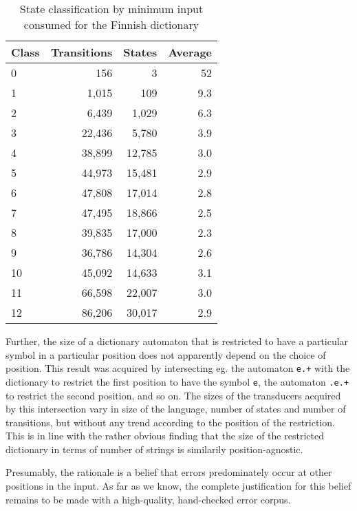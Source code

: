 \documentclass[free]{flammie}
\begin{document}
\begin{table}[h]
\begin{center}
\begin{scriptsize}
\begin{tabular}{|l|rrr|}
\hline
\bf Class & \bf Transitions & \bf States & \bf Average \\ 
\hline
0 & 156 & 3 & 52 \\
1 & 1,015 & 109 & 9.3 \\
2 & 6,439 & 1,029 & 6.3 \\
3 & 22,436 & 5,780 & 3.9 \\
4 & 38,899 & 12,785 & 3.0 \\
5 & 44,973 & 15,481 & 2.9 \\
6 & 47,808 & 17,014 & 2.8 \\
7 & 47,495 & 18,866 & 2.5 \\
8 & 39,835 & 17,000 & 2.3 \\
9 & 36,786 & 14,304 & 2.6 \\
10 & 45,092 & 14,633 & 3.1 \\
11 & 66,598 & 22,007 & 3.0 \\
12 & 86,206 & 30,017 & 2.9 \\
\hline
\end{tabular}
\end{scriptsize}
\end{center}
\caption{\label{table:fi-state-classification}
State classification by minimum input consumed for the Finnish dictionary}
\end{table}

Further, the size of a dictionary automaton that is restricted to have
a particular symbol in a particular position does not apparently depend on the
choice of position. This result was acquired by intersecting eg. the automaton
\texttt{e.+} with the dictionary to restrict the first
position to have the symbol
\texttt{e}, the automaton
\texttt{.e.+} to restrict the second position, and so on.
The sizes of the transducers acquired by this intersection vary in size of the
language, number of states and number of transitions, but without any trend
according to the position of the restriction.
This is in line with the rather obvious finding that the
size of the restricted dictionary in terms of number of strings is similarily
position-agnostic.

Presumably, the rationale is a belief that errors predominately occur at other
positions in the input. As far as we know, the complete justification for this
belief remains to be made with a high-quality, hand-checked error corpus.
\end{document}
